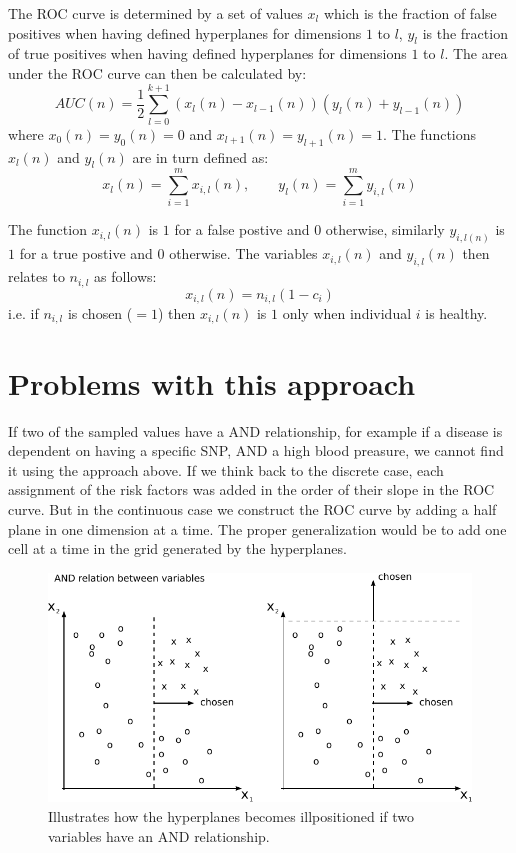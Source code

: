 \documentclass[a4paper]{article}
\begin{document}
The ROC curve is determined by a set of values $x_l$ which is the fraction of false positives when having defined hyperplanes for dimensions $1$ to $l$, $y_l$ is the fraction of true positives when having defined hyperplanes for dimensions $1$ to $l$. The area under the ROC curve can then be calculated by:
$$ AUC(n) = \frac{1}{2} \sum_{l=0}^{k+1} (x_l(n) - x_{l-1}(n))(y_l(n) + y_{l-1}(n)) $$
where $x_0(n) = y_0(n) = 0$ and $x_{l+1}(n) = y_{l+1}(n) = 1$. The functions $x_l(n)$ and $y_l(n)$ are in turn defined as:
$$ x_l(n) = \sum_{i=1}^{m} x_{i,l}(n), \qquad y_l(n) = \sum_{i=1}^{m} y_{i,l}(n)$$

The function $x_{i,l}(n)$ is $1$ for a false postive and $0$ otherwise, similarly $y_{i,l(n)}$ is $1$ for a true postive and $0$ otherwise. The variables $x_{i,l}(n)$ and $y_{i,l}(n)$ then relates to $n_{i,l}$ as follows:
$$x_{i,l}(n) = n_{i,l}(1-c_i)$$
i.e. if $n_{i,l}$ is chosen ($=1$) then $x_{i,l}(n)$ is $1$ only when individual $i$ is healthy.

\section{Problems with this approach}
If two of the sampled values have a AND relationship, for example if a disease is dependent on having a specific SNP, AND a high blood preasure, we cannot find it using the approach above. If we think back to the discrete case, each assignment of the risk factors was added in the order of their slope in the ROC curve. But in the continuous case we construct the ROC curve by adding a half plane in one dimension at a time. The proper generalization would be to add one cell at a time in the grid generated by the hyperplanes.

\begin{figure}[h]
  \centering
  \includegraphics[scale=0.8]{graphics/problem}
  \caption{Illustrates how the hyperplanes becomes illpositioned if two variables have an AND relationship.}\label{fig:problem}
\end{figure}
\end{document}
